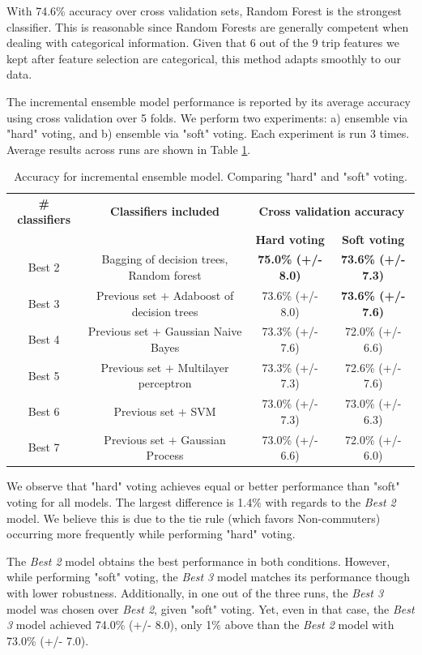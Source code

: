 \documentclass{article}
\begin{document}
With 74.6\% accuracy over cross validation sets, Random Forest is the strongest classifier. This is reasonable since Random Forests are generally competent when dealing with categorical information. Given that 6 out of the 9 trip features we kept after feature selection are categorical, this method adapts smoothly to our data. 

The incremental ensemble model performance is reported by its average accuracy using cross validation over 5 folds. We perform two experiments: a) ensemble via "hard" voting, and b) ensemble via "soft" voting. Each experiment is run 3 times. Average results across runs are shown in Table \ref{table:ensembleModels}. 

\begin{table}[H]
\centering
\begin{tabular}{||c|c|c|c||}
\hline
\textbf{\# classifiers} & \textbf{Classifiers included} & \multicolumn{2}{|c|}{\textbf{Cross validation accuracy}} \\ \cline{3-4}
 &  & \textbf{Hard voting} & \textbf{Soft voting} \\ [0.5ex] 
\hline \hline
Best 2 & {Bagging of decision trees, Random forest} & \textbf{75.0\% (+/- 8.0)} & \textbf{73.6\% (+/- 7.3)}\\
Best 3 & Previous set $+$ {Adaboost of decision trees} & 73.6\% (+/- 8.0) & \textbf{73.6\% (+/- 7.6)}\\
Best 4 & Previous set $+$ {Gaussian Naive Bayes} & 73.3\% (+/- 7.6) & 72.0\% (+/- 6.6)\\
Best 5 & Previous set $+$ {Multilayer perceptron} & 73.3\% (+/- 7.3) & 72.6\% (+/- 7.6)\\
Best 6 & Previous set $+$ {SVM} & 73.0\% (+/- 7.3) & 73.0\% (+/- 6.3) \\
Best 7 & Previous set $+$ {Gaussian Process} & 73.0\% (+/- 6.6) & 72.0\% (+/- 6.0) \\ 
\hline 
\end{tabular}
\caption{Accuracy for incremental ensemble model. Comparing "hard" and "soft" voting.}
\label{table:ensembleModels}
\end{table}

We observe that "hard" voting achieves equal or better performance than "soft" voting for all models. The largest difference is 1.4\% with regards to the \textit{Best 2} model. We believe this is due to the tie rule (which favors Non-commuters) occurring more frequently while performing "hard" voting. 

The \textit{Best 2} model obtains the best performance in both conditions. However, while performing "soft" voting, the \textit{Best 3} model matches its performance though with lower robustness. Additionally, in one out of the three runs, the \textit{Best 3} model was chosen over \textit{Best 2}, given "soft" voting. Yet, even in that case, the \textit{Best 3} model achieved 74.0\% (+/- 8.0), only 1\% above than the \textit{Best 2} model with 73.0\% (+/- 7.0). 
\end{document}
